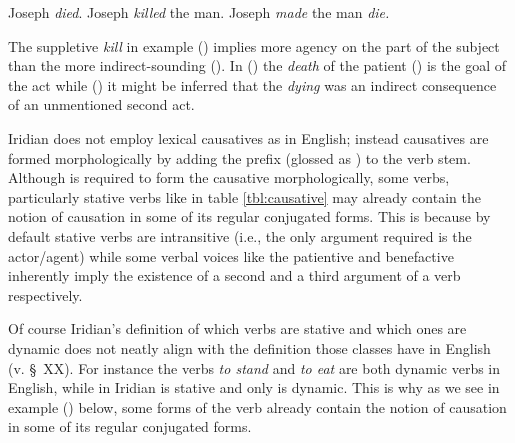 \pex
\a Joseph \emph{died}.
\a Joseph \emph{killed} the man.
\a Joseph \emph{made} the man \emph{die.}
\xe

The suppletive \emph{kill} in example () implies more agency on the part of the subject than the more indirect-sounding (). In () the \emph{death} of the patient () is the goal of the act while () it might be inferred that the \emph{dying} was an indirect consequence of an unmentioned second act.


Iridian does not employ lexical causatives as in English; instead causatives are formed morphologically by adding the prefix  (glossed as ) to the verb stem. Although  is required to form the causative morphologically, some verbs, particularly stative verbs like  in table \ref{tbl:causative} may already contain the notion of causation in some of its regular conjugated forms. This is because by default stative verbs are intransitive (i.e., the only argument required is the actor/agent) while some verbal voices like the patientive and benefactive inherently imply the existence of a second and a third argument of a verb respectively.


Of course Iridian's definition of which verbs are stative and which ones are dynamic does not neatly align with the definition those classes have in English (v. \S~XX). For instance the verbs \emph{to stand} and \emph{to eat} are both dynamic verbs in English, while in Iridian  is stative and only  is dynamic. This is why as we see in example () below, some forms of the verb  already contain the notion of causation in some of its regular conjugated forms.

\pex
\a  {}\\
		\\
    \\
    \\
\a  {}\\
    \\
\xe

